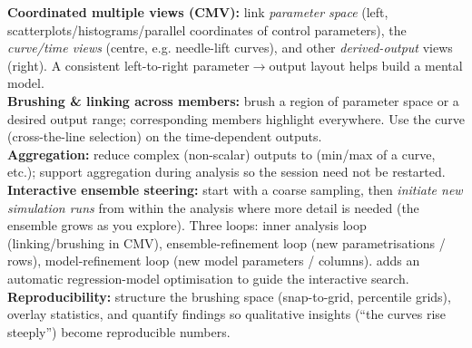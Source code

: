 \begin{algobox}
\textbf{Coordinated multiple views (CMV):} link \emph{parameter space} (left,
scatterplots/histograms/parallel coordinates of control parameters), the
\emph{curve/time views} (centre, e.g. needle-lift curves), and other
\emph{derived-output} views (right). A consistent left-to-right
parameter$\to$output layout helps build a mental model.\\
\textbf{Brushing \& linking across members:} brush a region of parameter space
or a desired output range; corresponding members highlight everywhere. Use the
curve  (cross-the-line selection) on the time-dependent
outputs.\\
\textbf{Aggregation:} reduce complex (non-scalar) outputs to  (min/max of a curve, etc.); support 
aggregation during analysis so the session need not be restarted.\\
\textbf{Interactive ensemble steering:} start with a coarse sampling, then
\emph{initiate new simulation runs} from within the analysis where more detail
is needed (the ensemble grows as you explore). Three loops: inner analysis
loop (linking/brushing in CMV), ensemble-refinement loop (new parametrisations
/ rows), model-refinement loop (new model parameters / columns).  adds an automatic regression-model optimisation to guide the
interactive search.\\
\textbf{Reproducibility:} structure the brushing space (snap-to-grid,
percentile grids), overlay statistics, and quantify findings so qualitative
insights (``the curves rise steeply'') become reproducible numbers.
\end{algobox}

